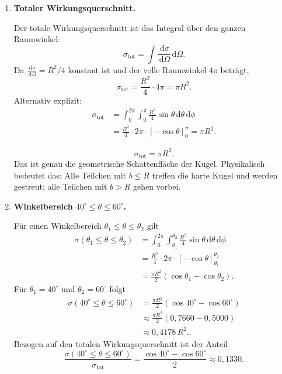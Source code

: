 \documentclass[11pt,a4paper]{scrartcl}
\newcommand{\paren}[1]{\left( #1 \right)}
\newcommand{\bracket}[1]{\left[ #1 \right]}
\newcommand{\dd}{\,\mathrm{d}}
\newcommand{\diffxs}{\frac{\dd\sigma}{\dd\Omega}}
\theoremstyle{definition}
\theoremstyle{plain}
\theoremstyle{remark}
\begin{document}
\begin{enumerate}[label=(\alph*)]
    \item \textbf{Totaler Wirkungsquerschnitt.}

    \begin{calculationbox}
    Der totale Wirkungsquerschnitt ist das Integral über den ganzen Raumwinkel:
    \[
        \sigma_{\mathrm{tot}}
        = \int \diffxs\dd\Omega.
    \]
    Da $\diffxs=R^2/4$ konstant ist und der volle Raumwinkel $4\pi$ beträgt,
    \[
        \sigma_{\mathrm{tot}}
        =\frac{R^2}{4}\cdot4\pi
        =\pi R^2.
    \]
    Alternativ explizit:
    \begin{align*}
        \sigma_{\mathrm{tot}}
        &= \int_0^{2\pi}\int_0^\pi \frac{R^2}{4}\sin\theta\dd\theta\dd\phi\\
        &= \frac{R^2}{4}\cdot2\pi\cdot\bracket{-\cos\theta}_0^\pi
         = \pi R^2.
    \end{align*}
    \end{calculationbox}

    \begin{answerbox}
    \[
        \boxed{\sigma_{\mathrm{tot}}=\pi R^2}.
    \]
    Das ist genau die geometrische Schattenfläche der Kugel. Physikalisch bedeutet das: Alle Teilchen mit $b\le R$ treffen die harte Kugel und werden gestreut; alle Teilchen mit $b>R$ gehen vorbei.
    \end{answerbox}

    \item \textbf{Winkelbereich $40^\circ\leq\theta\leq60^\circ$.}

    \begin{calculationbox}
    Für einen Winkelbereich $\theta_1\le\theta\le\theta_2$ gilt
    \begin{align*}
        \sigma(\theta_1\le\theta\le\theta_2)
        &= \int_0^{2\pi}\int_{\theta_1}^{\theta_2}\frac{R^2}{4}\sin\theta\dd\theta\dd\phi\\
        &= \frac{R^2}{4}\cdot2\pi\cdot\bracket{-\cos\theta}_{\theta_1}^{\theta_2}\\
        &= \frac{\pi R^2}{2}\paren{\cos\theta_1-\cos\theta_2}.
    \end{align*}
    Für $\theta_1=40^\circ$ und $\theta_2=60^\circ$ folgt
    \begin{align*}
        \sigma(40^\circ\le\theta\le60^\circ)
        &= \frac{\pi R^2}{2}\paren{\cos 40^\circ-\cos 60^\circ}\\
        &\approx \frac{\pi R^2}{2}(0{,}7660-0{,}5000)\\
        &\approx 0{,}4178\,R^2.
    \end{align*}
    Bezogen auf den totalen Wirkungsquerschnitt ist der Anteil
    \[
        \frac{\sigma(40^\circ\le\theta\le60^\circ)}{\sigma_{\mathrm{tot}}}
        =\frac{\cos40^\circ-\cos60^\circ}{2}
        \approx 0{,}1330.
    \]
    \end{calculationbox}


\end{enumerate}
\end{document}
